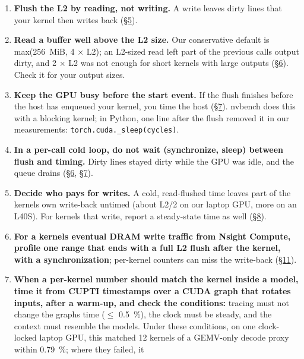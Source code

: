 \documentclass[11pt,a4paper]{article}
\providecommand{\tightlist}{\setlength{\itemsep}{0pt}\setlength{\parskip}{0pt}}
\begin{document}
\begin{enumerate}
\def\labelenumi{\arabic{enumi}.}
\tightlist
\item
  \textbf{Flush the L2 by reading, not writing.} A write leaves dirty lines that your kernel then writes back (\hyperref[how-big-is-the-bias-nine-gpus]{\S{}5}).
\item
  \textbf{Read a buffer well above the L2 size.} Our conservative default is max(256~MiB, 4 \ensuremath{\times} L2); an L2-sized read
  left part of the previous call\textquotesingle s output dirty, and 2 \ensuremath{\times} L2 was not enough for short kernels with large outputs
  (\hyperref[what-removes-the-residue-and-what-does-not]{\S{}6}). Check it for your output sizes.
\item
  \textbf{Keep the GPU busy before the start event.} If the flush finishes before the host has enqueued your
  kernel, you time the host (\hyperref[pitfall-2-queue-drain]{\S{}7}). nvbench does this with a blocking kernel; in Python, one line after the flush
  removed it in our measurements: \texttt{torch.cuda.\_\allowbreak{}sleep(cycles)}.
\item
  \textbf{In a per-call cold loop, do not wait (synchronize, sleep) between flush and timing.} Dirty lines stayed dirty
  while the GPU was idle, and the queue drains (\hyperref[what-removes-the-residue-and-what-does-not]{\S{}6}, \hyperref[pitfall-2-queue-drain]{\S{}7}).
\item
  \textbf{Decide who pays for writes.} A cold, read-flushed time leaves part of the kernel\textquotesingle s own write-back untimed
  (about L2/2 on our laptop GPU, more on an L40S). For kernels that write, report a steady-state time as well (\hyperref[pitfall-3-who-pays-for-a-kernels-own-writes]{\S{}8}).
\item
  \textbf{For a kernel\textquotesingle s eventual DRAM write traffic from Nsight Compute, profile one range that ends with a full L2
  flush after the kernel, with a synchronization}; per-kernel counters can miss the write-back (\hyperref[measurement-pitfall-per-kernel-dram-write-counters-lose-bytes]{\S{}11}).
\item
  \textbf{When a per-kernel number should match the kernel inside a model, time it from CUPTI timestamps over a CUDA
  graph that rotates inputs, after a warm-up, and check the conditions:} tracing must not change the graph\textquotesingle s time
  (\ensuremath{\le} 0.5~\%), the clock must be steady, and the context must resemble the model\textquotesingle s. Under these conditions, on one
  clock-locked laptop GPU, this matched 12 kernels of a GEMV-only decode proxy within 0.79~\%; where they failed, it

\end{enumerate}
\end{document}
